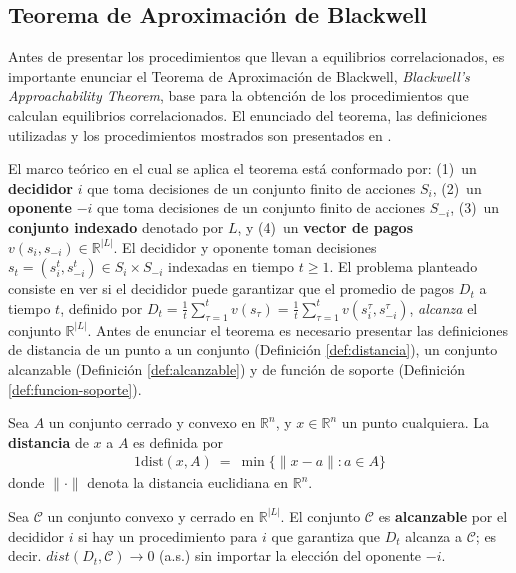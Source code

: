 \subsection{Teorema de Aproximación de Blackwell}
Antes de presentar los procedimientos que llevan a equilibrios correlacionados, es importante enunciar el Teorema de Aproximación de Blackwell, \textit{Blackwell's Approachability Theorem}, base para la obtención de los procedimientos que calculan equilibrios correlacionados. El enunciado del teorema, las definiciones utilizadas y los procedimientos mostrados son presentados en \cite{bib:correlated-equilibrium}.

El marco teórico en el cual se aplica el teorema está conformado por: (1)~un \textbf{decididor} $i$ que toma decisiones de un conjunto finito de acciones $S_i$, (2)~un \textbf{oponente} $-i$ que toma decisiones de un conjunto finito de acciones $S_{-i}$, (3)~un \textbf{conjunto indexado} denotado por $L$, y (4)~un \textbf{vector de pagos} $v(s_i, s_{-i}) \in \mathbb{R}^{|L|}$.
El decididor y oponente toman decisiones $s_t=(s^t_i,s^t_{-i})\in S_i\times S_{-i}$ indexadas en tiempo $t\geq 1$. El problema planteado consiste en ver si el decididor puede garantizar que el promedio de pagos $D_t$ a tiempo $t$, definido por $D_t=\frac{1}{t}\sum_{\tau=1}^t v(s_\tau)=\frac{1}{t}\sum_{\tau=1}^t v(s^\tau_i,s^\tau_{-i})$, \emph{alcanza} el conjunto $\mathbb{R}^{|L|}$.
Antes de enunciar el teorema es necesario presentar las definiciones de distancia de un punto a un conjunto (Definición \ref{def:distancia}), un conjunto alcanzable (Definición \ref{def:alcanzable}) y de función de soporte (Definición \ref{def:funcion-soporte}).

\begin{definition}
\label{def:distancia}
Sea $A$ un conjunto cerrado y convexo en $\mathbb{R}^n$, y $x \in \mathbb{R}^n$ un punto cualquiera. La \textbf{distancia} de $x$ a $A$ es definida por
\begin{alignat}{1}
\text{dist}(x, A)\ =\ \min\{ \|x - a\| : a \in A \}
\end{alignat}
donde $\|\cdot\|$ denota la distancia euclidiana en $\mathbb{R}^n$.
\end{definition}

\begin{definition}
\label{def:alcanzable}
Sea $\mathcal{C}$ un conjunto convexo y cerrado en $\mathbb{R}^{|L|}$. El conjunto $\mathcal{C}$ es \textbf{alcanzable} por el decididor $i$ si hay un procedimiento para $i$ que garantiza que $D_t$ alcanza a $\mathcal{C}$; es decir. $dist(D_t, \mathcal{C}) \rightarrow 0$ (a.s.) sin importar la elección del oponente $-i$.
\end{definition}

